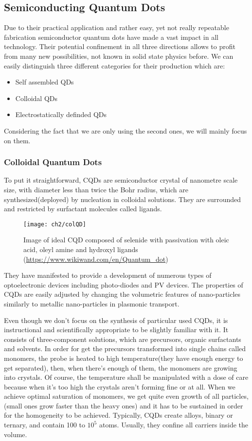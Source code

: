 \subsection{Semiconducting Quantum Dots}

Due to their practical application and rather easy, yet not really repeatable fabrication semiconductor quantum dots have made a vast impact in all technology. Their potential confinement in all three directions allows to profit from many new possibilities, not known in solid state physics before.
We can easily distinguish three different categories for their production which are:
\begin{itemize}
\item Self assembled QDs
\item Colloidal QDs
\item Electrostatically definded QDs 
\end{itemize}
Considering the fact that we are only using the second ones, we will mainly focus on them. 

\subsubsection{Colloidal Quantum Dots}
To put it straightforward, CQDs are semiconductor crystal of nanometre scale size, with diameter less than twice the Bohr radius, which are synthesized(deployed) by nucleation in colloidal solutions. They are surrounded and restricted by surfactant molecules called ligands. 

\begin{figure}[H]
\centering
\texttt{[image: ch2/colQD]}

\caption{Image of ideal CQD composed of selenide with passivation with oleic acid, oleyl amine and hydroxyl ligands (\url{https://www.wikiwand.com/en/Quantum_dot})}
\end{figure}

\noindent They have manifested to provide a development of numerous types of optoelectronic devices including photo-diodes and PV devices. The properties of CQDs are easily adjusted by changing the volumetric features of nano-particles similarly to metallic nano-particles in plasmonic transport. \cite{Abdelhady2015} \cite{G.D.Scholes2003}

\noindent Even though we don't focus on the synthesis of particular used CQDs, it is instructional and scientifically appropriate to be slightly familiar with it. It consists of three-component solutions, which are precursors, organic surfactants and solvents. In order for get the precursors transformed into single chains called monomers, the probe is heated to high temperature(they have enough energy to get separated), then, when there's enough of them, the monomers are growing into crystals. Of course, the temperature shall be manipulated with a dose of care because when it's too high the crystals aren't forming fine or at all. When we achieve optimal saturation of monomers, we get quite even growth of all particles, (small ones grow faster than the heavy ones) and it has to be sustained in order for the homogeneity to be achieved.
Typically, CQDs create alloys, binary or ternary, and contain 100 to $10^5$ atoms. Usually, they confine all carriers inside the volume.
